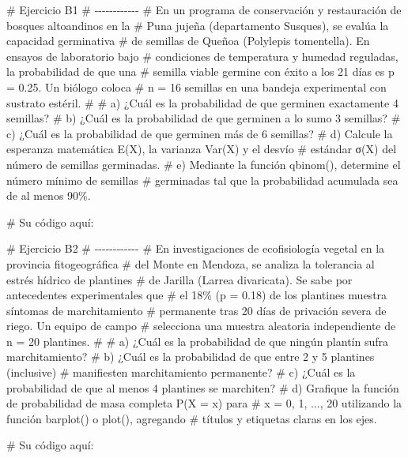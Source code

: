 \documentclass[
  spanish,
  letterpaper,
  DIV=11,
  numbers=noendperiod]{scrreprt}
\newenvironment{Shaded}{\begin{snugshade}}{\end{snugshade}}
\newcommand{\CommentTok}[1]{\textcolor[rgb]{0.37,0.37,0.37}{#1}}
\begin{document}
\begin{Shaded}
\begin{Highlighting}[]
\CommentTok{\# Ejercicio B1}
\CommentTok{\# {-}{-}{-}{-}{-}{-}{-}{-}{-}{-}{-}{-}}
\CommentTok{\# En un programa de conservación y restauración de bosques altoandinos en la}
\CommentTok{\# Puna jujeña (departamento Susques), se evalúa la capacidad germinativa}
\CommentTok{\# de semillas de Queñoa (Polylepis tomentella). En ensayos de laboratorio bajo}
\CommentTok{\# condiciones de temperatura y humedad reguladas, la probabilidad de que una}
\CommentTok{\# semilla viable germine con éxito a los 21 días es p = 0.25. Un biólogo coloca}
\CommentTok{\# n = 16 semillas en una bandeja experimental con sustrato estéril.}
\CommentTok{\#}
\CommentTok{\# a) ¿Cuál es la probabilidad de que germinen exactamente 4 semillas?}
\CommentTok{\# b) ¿Cuál es la probabilidad de que germinen a lo sumo 3 semillas?}
\CommentTok{\# c) ¿Cuál es la probabilidad de que germinen más de 6 semillas?}
\CommentTok{\# d) Calcule la esperanza matemática E(X), la varianza Var(X) y el desvío}
\CommentTok{\#    estándar σ(X) del número de semillas germinadas.}
\CommentTok{\# e) Mediante la función qbinom(), determine el número mínimo de semillas}
\CommentTok{\#    germinadas tal que la probabilidad acumulada sea de al menos 90\%.}

\CommentTok{\# Su código aquí:}


\CommentTok{\# Ejercicio B2}
\CommentTok{\# {-}{-}{-}{-}{-}{-}{-}{-}{-}{-}{-}{-}}
\CommentTok{\# En investigaciones de ecofisiología vegetal en la provincia fitogeográfica}
\CommentTok{\# del Monte en Mendoza, se analiza la tolerancia al estrés hídrico de plantines}
\CommentTok{\# de Jarilla (Larrea divaricata). Se sabe por antecedentes experimentales que}
\CommentTok{\# el 18\% (p = 0.18) de los plantines muestra síntomas de marchitamiento}
\CommentTok{\# permanente tras 20 días de privación severa de riego. Un equipo de campo}
\CommentTok{\# selecciona una muestra aleatoria independiente de n = 20 plantines.}
\CommentTok{\#}
\CommentTok{\# a) ¿Cuál es la probabilidad de que ningún plantín sufra marchitamiento?}
\CommentTok{\# b) ¿Cuál es la probabilidad de que entre 2 y 5 plantines (inclusive)}
\CommentTok{\#    manifiesten marchitamiento permanente?}
\CommentTok{\# c) ¿Cuál es la probabilidad de que al menos 4 plantines se marchiten?}
\CommentTok{\# d) Grafique la función de probabilidad de masa completa P(X = x) para}
\CommentTok{\#    x = 0, 1, ..., 20 utilizando la función barplot() o plot(), agregando}
\CommentTok{\#    títulos y etiquetas claras en los ejes.}

\CommentTok{\# Su código aquí:}



\end{Highlighting}
\end{Shaded}
\end{document}
